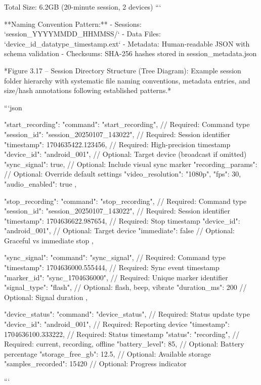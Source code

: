 \documentclass[12pt,a4paper]{article}
\begin{document}
Total Size: 6.2GB (20-minute session, 2 devices)
```

**Naming Convention Pattern:**
- Sessions: `session_YYYYMMDD_HHMMSS/`
- Data Files: `{device_id}_{datatype}_{timestamp}.{ext}`
- Metadata: Human-readable JSON with schema validation
- Checksums: SHA-256 hashes stored in session_metadata.json

*Figure 3.17 – Session Directory Structure (Tree Diagram): Example session folder hierarchy with systematic file naming conventions, metadata entries, and size/hash annotations following established patterns.*

```json
{
  "start_recording": {
    "command": "start_recording",           // Required: Command type
    "session_id": "session_20250107_143022", // Required: Session identifier  
    "timestamp": 1704635422.123456,         // Required: High-precision timestamp
    "device_id": "android_001",             // Optional: Target device (broadcast if omitted)
    "sync_signal": true,                    // Optional: Include visual sync marker
    "recording_params": {                   // Optional: Override default settings
      "video_resolution": "1080p",
      "fps": 30,
      "audio_enabled": true
    }
  },
  
  "stop_recording": {
    "command": "stop_recording",            // Required: Command type
    "session_id": "session_20250107_143022", // Required: Session identifier
    "timestamp": 1704636622.987654,         // Required: Stop timestamp
    "device_id": "android_001",             // Optional: Target device
    "immediate": false                      // Optional: Graceful vs immediate stop
  },
  
  "sync_signal": {
    "command": "sync_signal",               // Required: Command type
    "timestamp": 1704636000.555444,         // Required: Sync event timestamp
    "marker_id": "sync_1704636000",         // Required: Unique marker identifier
    "signal_type": "flash",                 // Optional: flash, beep, vibrate
    "duration_ms": 200                      // Optional: Signal duration
  },
  
  "device_status": {
    "command": "device_status",             // Required: Status update type
    "device_id": "android_001",             // Required: Reporting device
    "timestamp": 1704636100.333222,         // Required: Status timestamp
    "status": "recording",                  // Required: current, recording, offline
    "battery_level": 85,                    // Optional: Battery percentage
    "storage_free_gb": 12.5,               // Optional: Available storage
    "samples_recorded": 15420               // Optional: Progress indicator
  }
}
```
\end{document}
